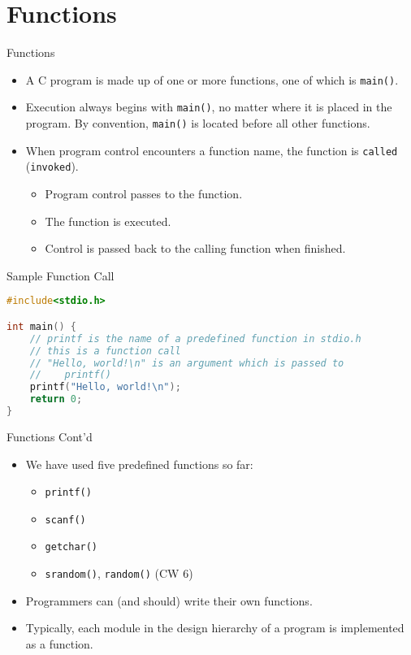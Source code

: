 \documentclass[graphics]{beamer}
\begin{document}
\section{Functions}
\begin{frame}{Functions}
    \begin{itemize}
        \item A C program is made up of one or more functions, one of which is \texttt{main()}.
        \item Execution always begins with \texttt{main()}, no matter where it is placed in the program. By convention, \texttt{main()} is located before all other functions.
        \item When program control encounters a function name, the function is \texttt{called} (\texttt{invoked}).
        \begin{itemize}
            \item Program control passes to the function.
            \item The function is executed.
            \item Control is passed back to the calling function when finished.
        \end{itemize}
    \end{itemize}
\end{frame}

\begin{frame}[fragile]{Sample Function Call}
    \begin{lstlisting}[language=C,basicstyle=\footnotesize,keywordstyle=\color{blue},commentstyle=\color{green},showstringspaces=false,stringstyle=\color{red}]
#include<stdio.h>

int main() {
    // printf is the name of a predefined function in stdio.h
    // this is a function call
    // "Hello, world!\n" is an argument which is passed to
    //    printf()
    printf("Hello, world!\n");
    return 0;
}
    \end{lstlisting}
\end{frame}

\begin{frame}{Functions Cont'd}
    \begin{itemize}
        \item We have used five predefined functions so far:
        \begin{itemize}
            \item \texttt{printf()}
            \item \texttt{scanf()}
            \item \texttt{getchar()}
            \item \texttt{srandom()}, \texttt{random()} (CW 6)
        \end{itemize}
        \item Programmers can (and should) write their own functions.
        \item Typically, each module in the design hierarchy of a program is implemented as a function.
    \end{itemize}
\end{frame}
\end{document}
